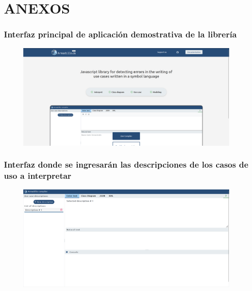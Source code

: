 \setcounter{chapter}{6}
\setcounter{section}{0}
\part{ANEXOS}

\section{Interfaz principal de aplicación demostrativa de la librería}
\begin{figure}[H]
	\centering
	\includegraphics[width=15cm]{img/anexo1.png}
	\label{fig:anexo1}
\end{figure} 

\section{Interfaz donde se ingresarán las descripciones de los casos de uso a interpretar}
\begin{figure}[H]
	\centering
	\includegraphics[width=15cm]{img/anexo2.png}
	\label{fig:anexo2}
\end{figure} 

